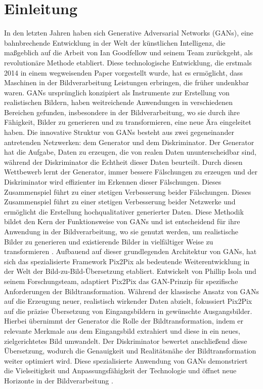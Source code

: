 \chapter{Einleitung}
In den letzten Jahren haben sich Generative Adversarial Networks (GANs), eine bahnbrechende Entwicklung in der Welt der künstlichen Intelligenz, die maßgeblich auf die Arbeit von Ian Goodfellow und seinem Team zurückgeht, als revolutionäre Methode etabliert. Diese technologische Entwicklung, die erstmals 2014 in einem wegweisenden Paper vorgestellt wurde, hat es ermöglicht, dass Maschinen in der Bildverarbeitung Leistungen erbringen, die früher undenkbar waren. GANs ursprünglich konzipiert als Instrumente zur Erstellung von realistischen Bildern, haben weitreichende Anwendungen in verschiedenen Bereichen gefunden, insbesondere in der Bildverarbeitung, wo sie durch ihre Fähigkeit, Bilder zu generieren und zu transformieren, eine neue Ära eingeleitet haben. \newline
Die innovative Struktur von GANs besteht aus zwei gegeneinander antretenden Netzwerken: dem Generator und dem Diskriminator. Der Generator hat die Aufgabe, Daten zu erzeugen, die von realen Daten ununterscheidbar sind, während der Diskriminator die Echtheit dieser Daten beurteilt. Durch diesen Wettbewerb lernt der Generator, immer bessere Fälschungen zu erzeugen und der Diskriminator wird effizienter im Erkennen dieser Fälschungen. Dieses Zusammenspiel führt zu einer stetigen Verbesserung beider Fälschungen. Dieses Zusammenspiel führt zu einer stetigen Verbesserung beider Netzwerke und ermöglicht die Erstellung hochqualitativer generierter Daten. Diese Methodik bildet den Kern der Funktionsweise von GANs und ist entscheidend für ihre Anwendung in der Bildverarbeitung, wo sie genutzt werden, um realistische Bilder zu generieren und existierende Bilder in vielfältiger Weise zu transformieren \cite{Goodfellow2014}.
\newline
Aufbauend auf dieser grundlegenden Architektur von GANs, hat sich das spezialisierte Framework Pix2Pix als bedeutende Weiterentwicklung in der Welt der Bild-zu-Bild-Übersetzung etabliert. Entwickelt von Phillip Isola und seinem Forschungsteam, adaptiert Pix2Pix das GAN-Prinzip für spezifische Anforderungen der Bildtransformation. Während der klassische Ansatz von GANs auf die Erzeugung neuer, realistisch wirkender Daten abzielt, fokussiert Pix2Pix auf die präzise Übersetzung von Eingangsbildern in gewünschte Ausgangsbilder. Hierbei übernimmt der Generator die Rolle der Bildtransformation, indem er relevante Merkmale aus dem Eingangsbild extrahiert und diese in ein neues, zielgerichtetes Bild umwandelt. Der Diskriminator bewertet anschließend diese Übersetzung, wodurch die Genauigkeit und Realitätsnähe der Bildtransformation weiter optimiert wird. Diese spezialisierte Anwendung von GANs demonstriert die Vielseitigkeit und Anpassungsfähigkeit der Technologie und öffnet neue Horizonte in der Bildverarbeitung \cite{PhillipIsola.}.
